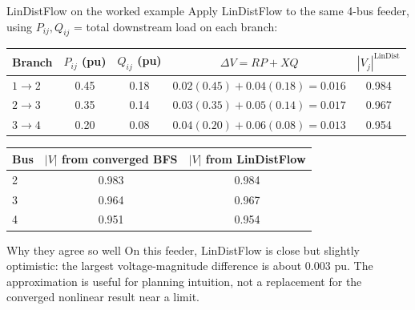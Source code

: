 \documentclass[aspectratio=169,10pt]{beamer}
\begin{document}
\begin{frame}{LinDistFlow on the worked example}
Apply LinDistFlow to the same 4-bus feeder, using $P_{ij}, Q_{ij}$ = total downstream load on each branch:
\vspace{0.3em}
\centering
\small
\begin{tabular}{lcccc}
\toprule
Branch & $P_{ij}$ (pu) & $Q_{ij}$ (pu) & $\Delta V = RP + XQ$ & $|V_j|^{\text{LinDist}}$ \\
\midrule
$1 \to 2$ & 0.45 & 0.18 & $0.02(0.45)+0.04(0.18)\!=\!0.016$ & 0.984 \\
$2 \to 3$ & 0.35 & 0.14 & $0.03(0.35)+0.05(0.14)\!=\!0.017$ & 0.967 \\
$3 \to 4$ & 0.20 & 0.08 & $0.04(0.20)+0.06(0.08)\!=\!0.013$ & 0.954 \\
\bottomrule
\end{tabular}
\vspace{0.5em}
\centering
\small
\begin{tabular}{lcc}
\toprule
Bus & $|V|$ from converged BFS & $|V|$ from LinDistFlow \\
\midrule
2 & 0.983 & 0.984 \\
3 & 0.964 & 0.967 \\
4 & 0.951 & 0.954 \\
\bottomrule
\end{tabular}
\vspace{0.5em}
\begin{block}{Why they agree so well}
On this feeder, LinDistFlow is close but slightly optimistic: the largest voltage-magnitude difference is about $0.003$ pu. The approximation is useful for planning intuition, not a replacement for the converged nonlinear result near a limit.
\end{block}
\end{frame}
\end{document}
